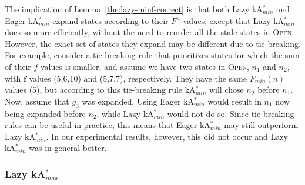 \documentclass{aicom2e}
\newcommand{\kastarmin}{kA$^*_{min}$}
\newcommand{\kastarmax}{kA$^*_{max}$}
\newcommand{\minf}{$F_{min}(n)$}
\newcommand{\open}{\textsc{Open}}
\newcommand{\roni}[1]{\textbf{[RS:#1]}}
\begin{document}
The implication of Lemma~\ref{the:lazy-minf-correct} is that both Lazy
\kastarmin{} and Eager \kastarmin{} expand states according to their $F^u$
values, except that Lazy \kastarmin{} does so more efficiently, without the
need to reorder all the stale states in \open{}. 
However, the exact set of states they expand may be different
due to tie breaking. For example, consider a tie-breaking rule that prioritizes
states for which the sum of their $f$ values is smaller, and assume we have two
states in \open{}, $n_1$ and $n_2$, with $\mathbf{f}$ values (5,6,10) and
(5,7,7), respectively. They have the same \minf{} values (5), but according to
this tie-breaking rule \kastarmin{} will chose $n_2$ before $n_1$. Now, assume
that $g_3$ was expanded. Using Eager \kastarmin{} would result in $n_1$ now
being expanded before $n_2$, while Lazy \kastarmin{} would not do so. Since
tie-breaking rules can be useful in practice, this means that Eager
\kastarmin{} may still outperform Lazy \kastarmin{}. In our experimental
results, however, this did not occur and Lazy \kastarmin{} was in general
better. %


\subsubsection{Lazy \kastarmax{}}
\end{document}
